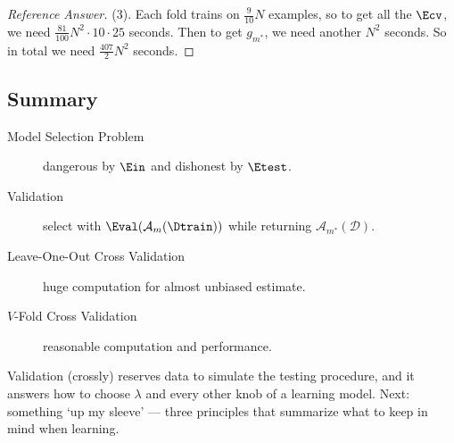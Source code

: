 \begin{proof}[Reference Answer]
    (3). Each fold trains on \(\frac{9}{10} N\) examples, so to get all the
    \(\Ecv\), we need \(\frac{81}{100} N^2 \cdot 10 \cdot 25\) seconds. Then
    to get \(g_{m^*}\), we need another \(N^2\) seconds. So in total we need
    \(\frac{407}{2} N^2\) seconds.
\end{proof}

\hrulebar

\subsection*{Summary}

\begin{description}
    \item[Model Selection Problem] dangerous by \(\Ein\) and dishonest by
        \(\Etest\).
    \item[Validation] select with \(\Eval(\mathcal{A}_m(\Dtrain))\) while
        returning \(\mathcal{A}_{m^*}(\mathcal{D})\).
    \item[Leave-One-Out Cross Validation] huge computation for almost unbiased
        estimate.
    \item[\(V\)-Fold Cross Validation] reasonable computation and performance.
\end{description}

Validation (crossly) reserves data to simulate the testing procedure, and it
answers how to choose \(\lambda\) and every other knob of a learning model.
Next: something `up my sleeve' --- three principles that summarize what to
keep in mind when learning.
